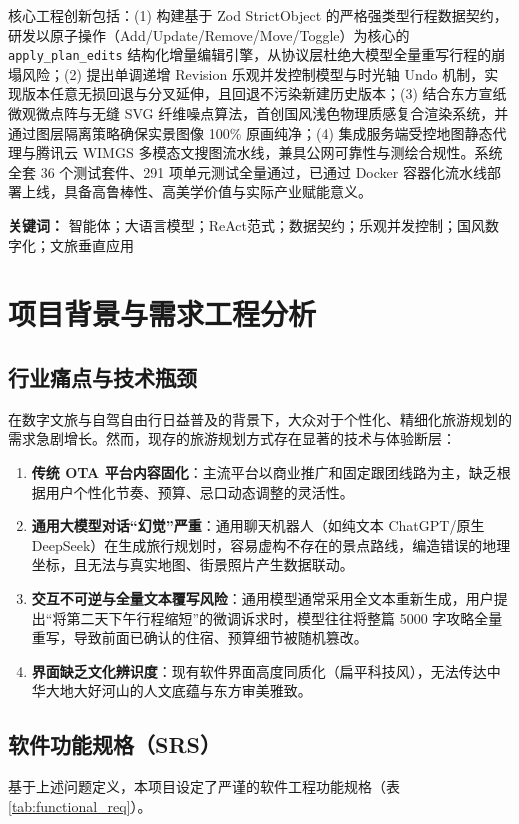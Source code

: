 \documentclass[11pt,a4paper,UTF8]{ctexart}
\begin{document}
核心工程创新包括：(1) 构建基于 Zod StrictObject 的严格强类型行程数据契约，研发以原子操作（Add/Update/Remove/Move/Toggle）为核心的 \texttt{apply\_plan\_edits} 结构化增量编辑引擎，从协议层杜绝大模型全量重写行程的崩塌风险；(2) 提出单调递增 Revision 乐观并发控制模型与时光轴 Undo 机制，实现版本任意无损回退与分叉延伸，且回退不污染新建历史版本；(3) 结合东方宣纸微观微点阵与无缝 SVG 纤维噪点算法，首创国风浅色物理质感复合渲染系统，并通过图层隔离策略确保实景图像 100\% 原画纯净；(4) 集成服务端受控地图静态代理与腾讯云 WIMGS 多模态文搜图流水线，兼具公网可靠性与测绘合规性。系统全套 36 个测试套件、291 项单元测试全量通过，已通过 Docker 容器化流水线部署上线，具备高鲁棒性、高美学价值与实际产业赋能意义。

\textbf{关键词：} 智能体；大语言模型；ReAct范式；数据契约；乐观并发控制；国风数字化；文旅垂直应用

\newpage
\tableofcontents
\newpage

\section{项目背景与需求工程分析}

\subsection{行业痛点与技术瓶颈}
在数字文旅与自驾自由行日益普及的背景下，大众对于个性化、精细化旅游规划的需求急剧增长。然而，现存的旅游规划方式存在显著的技术与体验断层：
\begin{enumerate}[label=(\arabic*)]
    \item \textbf{传统 OTA 平台内容固化}：主流平台以商业推广和固定跟团线路为主，缺乏根据用户个性化节奏、预算、忌口动态调整的灵活性。
    \item \textbf{通用大模型对话“幻觉”严重}：通用聊天机器人（如纯文本 ChatGPT/原生 DeepSeek）在生成旅行规划时，容易虚构不存在的景点路线，编造错误的地理坐标，且无法与真实地图、街景照片产生数据联动。
    \item \textbf{交互不可逆与全量文本覆写风险}：通用模型通常采用全文本重新生成，用户提出“将第二天下午行程缩短”的微调诉求时，模型往往将整篇 5000 字攻略全量重写，导致前面已确认的住宿、预算细节被随机篡改。
    \item \textbf{界面缺乏文化辨识度}：现有软件界面高度同质化（扁平科技风），无法传达中华大地大好河山的人文底蕴与东方审美雅致。
\end{enumerate}

\subsection{软件功能规格（SRS）}
基于上述问题定义，本项目设定了严谨的软件工程功能规格（表 \ref{tab:functional_req}）。
\end{document}
